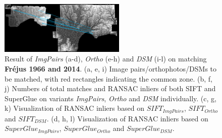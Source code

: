 \begin{figure}[htbp]
\begin{center}
{\begin{minipage}[t]{0.48\linewidth}
				\centering
				\includegraphics[width=6cm]{images/Chapitre3/Homol-SIFT2Step-Rough-2DRANSAC_MEC-Malt_Tapas_1966_MEC-Malt_2014.png}
			\end{minipage}%
		}
		\caption{{\scriptsize Result of \textit{ImgPairs} (a-d), \textit{Ortho} (e-h) and \textit{DSM} (i-l) on matching \textbf{Fr{\'e}jus 1966 and 2014}. (a, e, i) Image pairs/orthophotos/DSMs to be matched, with red rectangles indicating the common zone. (b, f, j) Numbers of total matches and RANSAC inliers of both SIFT and SuperGlue on variants \textit{ImgPairs}, \textit{Ortho} and \textit{DSM} individually. (c, g, k) Visualization of RANSAC inliers based on $SIFT_{ImgPairs}$, $SIFT_{Ortho}$ and $SIFT_{DSM}$. (d, h, l) Visualization of RANSAC inliers based on $SuperGlue_{ImgPairs}$, $SuperGlue_{Ortho}$ and $SuperGlue_{DSM}$.}}
		\label{MatchVizFrejus1966DSM}
	\end{center}
\end{figure} 



